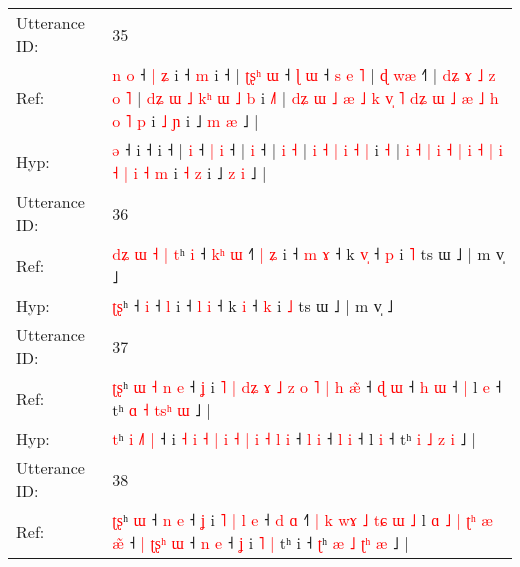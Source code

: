 \documentclass[10pt]{article}
\DeclareRobustCommand{\hl}[1]{{\textcolor{red}{#1}}}
\begin{document}
\begin{longtable}{ll}
 \\
\midrule
Utterance ID: & 35 \\
Ref: & \hl{n}\hl{ }\hl{o} ˧\hl{ }\hl{|}\hl{ }\hl{ʑ} i ˧\hl{ }\hl{m} i ˧ |\hl{ }\hl{ʈ}\hl{ʂ}\hl{ʰ} \hl{ɯ} ˧ \hl{ɭ} \hl{ɯ} ˧\hl{ }\hl{s}\hl{ }\hl{e}\hl{ }\hl{˥} |\hl{ }\hl{ɖ} \hl{w}\hl{æ} ˧\hl{˥} |\hl{ }\hl{d}\hl{ʑ}\hl{ }\hl{ɤ}\hl{ }\hl{˩}\hl{ }\hl{z} \hl{o} \hl{˥} |\hl{ }\hl{d}\hl{ʑ} \hl{ɯ} \hl{˩} \hl{k}\hl{ʰ} \hl{ɯ} \hl{˩} \hl{b} i \hl{˩}\hl{˥} |\hl{ }\hl{d}\hl{ʑ}\hl{ }\hl{ɯ} \hl{˩} \hl{æ} \hl{˩} \hl{k} \hl{v}\hl{̩} \hl{˥} \hl{d}\hl{ʑ} \hl{ɯ} \hl{˩} \hl{æ} \hl{˩} \hl{h} \hl{o} \hl{˥} \hl{p} i \hl{˩} \hl{ɲ} i ˩ \hl{m} \hl{æ} ˩ |
 \\
Hyp: & \hl{}\hl{}\hl{ə} ˧\hl{}\hl{}\hl{}\hl{} i ˧\hl{}\hl{} i ˧ |\hl{}\hl{}\hl{}\hl{} \hl{i} ˧ \hl{|} \hl{i} ˧\hl{}\hl{}\hl{}\hl{}\hl{}\hl{} |\hl{}\hl{} \hl{}\hl{i} ˧\hl{} |\hl{}\hl{}\hl{}\hl{}\hl{}\hl{}\hl{}\hl{}\hl{} \hl{i} \hl{˧} |\hl{}\hl{}\hl{} \hl{i} \hl{˧} \hl{}\hl{|} \hl{i} \hl{˧} \hl{|} i \hl{}\hl{˧} |\hl{}\hl{}\hl{}\hl{}\hl{} \hl{i} \hl{˧} \hl{|} \hl{i} \hl{}\hl{˧} \hl{|} \hl{}\hl{i} \hl{˧} \hl{|} \hl{i} \hl{˧} \hl{|} \hl{i} \hl{˧} \hl{m} i \hl{˧} \hl{z} i ˩ \hl{z} \hl{i} ˩ |
 \\
\midrule
Utterance ID: & 36 \\
Ref: & \hl{d}\hl{ʑ}\hl{ }\hl{ɯ}\hl{ }\hl{˧}\hl{ }\hl{|}\hl{ }\hl{t}ʰ\hl{ }\hl{i} ˧\hl{ }\hl{k}\hl{ʰ} \hl{ɯ} ˧\hl{˥}\hl{ }\hl{|} \hl{ʑ} i ˧ \hl{m} \hl{ɤ} ˧ k \hl{v}\hl{̩} ˧ \hl{p} i \hl{˥} ts ɯ ˩ | m v̩ ˩
 \\
Hyp: & \hl{}\hl{}\hl{}\hl{}\hl{}\hl{}\hl{}\hl{}\hl{ʈ}\hl{ʂ}ʰ\hl{}\hl{} ˧\hl{}\hl{}\hl{} \hl{i} ˧\hl{}\hl{}\hl{} \hl{l} i ˧ \hl{l} \hl{i} ˧ k \hl{}\hl{i} ˧ \hl{k} i \hl{˩} ts ɯ ˩ | m v̩ ˩
 \\
\midrule
Utterance ID: & 37 \\
Ref: & \hl{ʈ}\hl{ʂ}ʰ \hl{ɯ} \hl{˧}\hl{ }\hl{n} \hl{e} ˧\hl{ }\hl{ʝ} i \hl{˥} \hl{|} \hl{d}\hl{ʑ} \hl{ɤ} \hl{˩} \hl{z} \hl{o} \hl{˥} \hl{|} \hl{h} \hl{æ}\hl{̃} ˧ \hl{ɖ} \hl{ɯ} ˧ \hl{h} \hl{ɯ} ˧\hl{ }\hl{|} l \hl{e} ˧ tʰ \hl{ɑ} \hl{˧} \hl{t}\hl{s}\hl{ʰ} \hl{ɯ} ˩ |
 \\
Hyp: & \hl{}\hl{t}ʰ \hl{i} \hl{}\hl{˩}\hl{˥} \hl{|} ˧\hl{}\hl{} i \hl{˧} \hl{i} \hl{}\hl{˧} \hl{|} \hl{i} \hl{˧} \hl{|} \hl{i} \hl{˧} \hl{l} \hl{}\hl{i} ˧ \hl{l} \hl{i} ˧ \hl{l} \hl{i} ˧\hl{}\hl{} l \hl{i} ˧ tʰ \hl{i} \hl{˩} \hl{}\hl{}\hl{z} \hl{i} ˩ |
 \\
\midrule
Utterance ID: & 38 \\
Ref: & \hl{ʈ}\hl{ʂ}ʰ \hl{ɯ} ˧\hl{ }\hl{n} \hl{e} ˧\hl{ }\hl{ʝ} i\hl{ }\hl{˥}\hl{ }\hl{|}\hl{ }\hl{l}\hl{ }\hl{e} ˧\hl{ }\hl{d} \hl{ɑ} ˧\hl{˥}\hl{ }\hl{|}\hl{ }\hl{k}\hl{ }\hl{w}\hl{ɤ}\hl{ }\hl{˩}\hl{ }\hl{t}\hl{ɕ}\hl{ }\hl{ɯ}\hl{ }\hl{˩} l\hl{ }\hl{ɑ}\hl{ }\hl{˩} \hl{|} \hl{ʈ}\hl{ʰ} \hl{æ} \hl{æ}\hl{̃} ˧\hl{ }\hl{|} \hl{ʈ}\hl{ʂ}\hl{ʰ} \hl{ɯ} ˧ \hl{n} \hl{e} ˧ \hl{ʝ} i\hl{ }\hl{˥} \hl{|} tʰ i ˧ \hl{ʈ}ʰ \hl{æ} \hl{˩} \hl{ʈ}\hl{ʰ} \hl{æ} ˩ |

\end{longtable}
\end{document}
